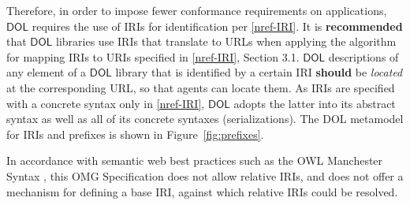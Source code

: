 \documentclass[10pt, a4paper]{isov2}
\makeatletter
\newcommand*\CommentAuthor{}
\renewcommand*\CommentAuthor{#1}}
\newcommand*\CommentDate{}
\renewcommand*\CommentDate{#1}}
\newcommand*\CommentId{}
\renewcommand*\CommentId{#1}}
\newcommand*\CommentType{}
\renewcommand*\CommentType{#1}}
\newcommand*{\SetCommentColorByType}[1]{%
\edef\localType{{#1}}%
\expandafter\ifstrequal\localType{q-aut}{\colorlet{CommentColor}{red}}{%
\expandafter\ifstrequal\localType{q-all}{\colorlet{CommentColor}{orange}}{%
\expandafter\ifstrequal\localType{todo}{\colorlet{CommentColor}{orange}}{%
\expandafter\ifstrequal\localType{fyi}{\colorlet{CommentColor}{lightgray}}{%
\colorlet{CommentColor}{yellow}}}}}}
\newcommand*{\SetCommentPrefixByType}[1]{%
\edef\localType{{#1}}%
\expandafter\@ifmtarg\localType{%
\edef\CommentPrefix{}%
}{%
\caseupper[q]{#1}%
\edef\CommentPrefix{\thestring: }%
}}
\newcommand*{\initComment}[1]{%
\setkeys{Comment}{#1}%
\SetCommentColorByType{\CommentType}%
\relax%
\SetCommentPrefixByType{\CommentType}%
\relax%
}
\newcommand*{\todonote}[2][]{%
\initComment{#1}%
\pdfcomment[author=\CommentAuthor,color=CommentColor,date=\CommentDate,id=\CommentId]{%
\CommentPrefix
#2}}
\renewcommand*{\todonote}[2][]{%
\initComment{#1}%
\ednote{\CommentPrefix #2}}
\newcommand*{\CLnote}[2][author=Christoph Lange]{%
\todonote[author=Christoph Lange,#1]{#2}}
\newcommand*{\recommended}{\textbf{recommended}\xspace}
\newcommand*{\should}{\textbf{should}\xspace}
\newcommand*{\IS}{OMG Specification\xspace}
\newcommand*{\DOL}{\ensuremath{\mathsf{DOL}}\xspace}
\renewcommand{\noterefname}{note}
\renewcommand{\nref}[1]{\noterefname~\ref{#1}}
\renewcommand{\nref}[1]{\ref{nref-#1}}
\makeatother
\begin{document}
Therefore, in order to impose fewer conformance requirements on applications, \DOL requires the use of
 IRIs for identification per \nref{IRI}.
  It is \recommended that \DOL libraries use
IRIs that translate to URLs when applying the algorithm for mapping IRIs to URIs specified in
\nref{IRI}, Section 3.1.  \DOL descriptions of any element of a \DOL library that is
identified by a certain IRI \should be \emph{located} at the corresponding URL, so that agents can
locate them.  As IRIs are specified with a concrete syntax only in \nref{IRI}, \DOL
adopts the latter into its abstract syntax as well as all of its concrete syntaxes
(serializations).
The DOL metamodel for IRIs and prefixes is shown in Figure~\ref{fig:prefixes}.




In accordance with semantic web best practices such as the OWL Manchester Syntax
\cite{W3C:owl2-manchester-syntax}, this \IS does not allow relative IRIs, and does
not offer a mechanism for defining a base IRI, against which relative IRIs could be resolved.
\end{document}
